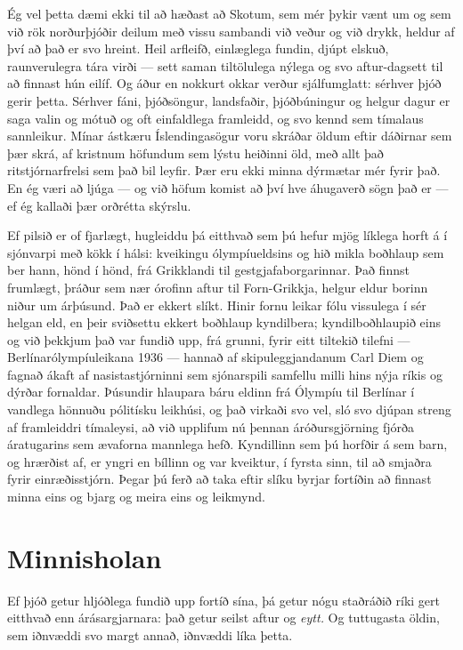 Ég vel þetta dæmi ekki til að hæðast að Skotum, sem mér þykir vænt um og sem við rök norðurþjóðir deilum með vissu sambandi við veður og við drykk, heldur af því að það er svo hreint. Heil arfleifð, einlæglega fundin, djúpt elskuð, raunverulegra tára virði — sett saman tiltölulega nýlega og svo aftur-dagsett til að finnast hún eilíf. Og áður en nokkurt okkar verður sjálfumglatt: sérhver þjóð gerir þetta. Sérhver fáni, þjóðsöngur, landsfaðir, þjóðbúningur og helgur dagur er saga valin og mótuð og oft einfaldlega framleidd, og svo kennd sem tímalaus sannleikur. Mínar ástkæru Íslendingasögur voru skráðar öldum eftir dáðirnar sem þær skrá, af kristnum höfundum sem lýstu heiðinni öld, með allt það ritstjórnarfrelsi sem það bil leyfir. Þær eru ekki minna dýrmætar mér fyrir það. En ég væri að ljúga — og við höfum komist að því hve áhugaverð sögn það er — ef ég kallaði þær orðrétta skýrslu.

Ef pilsið er of fjarlægt, hugleiddu þá eitthvað sem þú hefur mjög líklega horft á í sjónvarpi með kökk í hálsi: kveikingu ólympíueldsins og hið mikla boðhlaup sem ber hann, hönd í hönd, frá Grikklandi til gestgjafaborgarinnar. Það finnst frumlægt, þráður sem nær órofinn aftur til Forn-Grikkja, helgur eldur borinn niður um árþúsund. Það er ekkert slíkt. Hinir fornu leikar fólu vissulega í sér helgan eld, en þeir sviðsettu ekkert boðhlaup kyndilbera; kyndilboðhlaupið eins og við þekkjum það var fundið upp, frá grunni, fyrir eitt tiltekið tilefni — Berlínarólympíuleikana 1936 — hannað af skipuleggjandanum Carl Diem og fagnað ákaft af nasistastjórninni sem sjónarspili samfellu milli hins nýja ríkis og dýrðar fornaldar. Þúsundir hlaupara báru eldinn frá Ólympíu til Berlínar í vandlega hönnuðu pólitísku leikhúsi, og það virkaði svo vel, sló svo djúpan streng af framleiddri tímaleysi, að við upplifum nú þennan áróðursgjörning fjórða áratugarins sem ævaforna mannlega hefð. Kyndillinn sem þú horfðir á sem barn, og hrærðist af, er yngri en bíllinn og var kveiktur, í fyrsta sinn, til að smjaðra fyrir einræðisstjórn. Þegar þú ferð að taka eftir slíku byrjar fortíðin að finnast minna eins og bjarg og meira eins og leikmynd.

\section*{Minnisholan}

Ef þjóð getur hljóðlega fundið upp fortíð sína, þá getur nógu staðráðið ríki gert eitthvað enn árásargjarnara: það getur seilst aftur og \emph{eytt.} Og tuttugasta öldin, sem iðnvæddi svo margt annað, iðnvæddi líka þetta.

